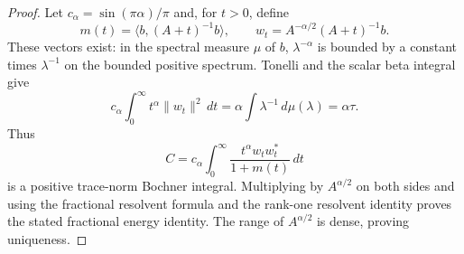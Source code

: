 \begin{proof}
Let $c_\alpha=\sin(\pi\alpha)/\pi$ and, for $t>0$, define
\[
 m(t)=\langle b,(A+t)^{-1}b\rangle,\qquad
 w_t=A^{-\alpha/2}(A+t)^{-1}b.
\]
These vectors exist: in the spectral measure $\mu$ of $b$,
$\lambda^{-\alpha}$ is bounded by a constant times $\lambda^{-1}$
on the bounded positive spectrum. Tonelli and the scalar beta integral
give
\begin{equation}\label{sharp:eq:trace-majorant}
 c_\alpha\int_0^\infty t^\alpha\|w_t\|^2\,dt
       =\alpha\int\lambda^{-1}\,d\mu(\lambda)=\alpha\tau.
\end{equation}
Thus
\begin{equation}\label{sharp:eq:resolvent}
 C=c_\alpha\int_0^\infty\frac{t^\alpha w_tw_t^*}{1+m(t)}\,dt
\end{equation}
is a positive trace-norm Bochner integral. Multiplying by
$A^{\alpha/2}$ on both sides and using the fractional resolvent formula
and the rank-one resolvent identity proves the stated fractional energy
identity. The range of $A^{\alpha/2}$ is dense, proving uniqueness.


\end{proof}
